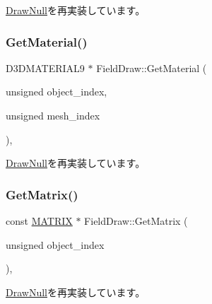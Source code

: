 \mbox{\hyperlink{class_draw_null_a8496ed1b1f765a331a8f1704122b8ca4}{Draw\+Null}}を再実装しています。

\mbox{\label{class_field_draw_ab126f938895211ff170bc37045a8e7a2}} 
\subsubsection{\texorpdfstring{Get\+Material()}{GetMaterial()}}
{\footnotesize\ttfamily D3\+D\+M\+A\+T\+E\+R\+I\+A\+L9 $\ast$ Field\+Draw\+::\+Get\+Material (\begin{DoxyParamCaption}\item[{unsigned}]{object\+\_\+index,  }\item[{unsigned}]{mesh\+\_\+index }\end{DoxyParamCaption})\hspace{0.3cm}{\ttfamily [override]}, {\ttfamily [virtual]}}



\mbox{\hyperlink{class_draw_null_a84969d22d3436986f214e9896fe44fc6}{Draw\+Null}}を再実装しています。

\mbox{\label{class_field_draw_a2629b4c4cd8e240e39c65b879c6e82b6}} 
\subsubsection{\texorpdfstring{Get\+Matrix()}{GetMatrix()}}
{\footnotesize\ttfamily const \mbox{\hyperlink{_vector3_d_8h_a032295cd9fb1b711757c90667278e744}{M\+A\+T\+R\+IX}} $\ast$ Field\+Draw\+::\+Get\+Matrix (\begin{DoxyParamCaption}\item[{unsigned}]{object\+\_\+index }\end{DoxyParamCaption})\hspace{0.3cm}{\ttfamily [override]}, {\ttfamily [virtual]}}



\mbox{\hyperlink{class_draw_null_adede079e9c11a756090740b20bb43022}{Draw\+Null}}を再実装しています。

\mbox{\label{class_field_draw_aeb54d8cba559ef615ee46c8a7bbd3b9f}} 
